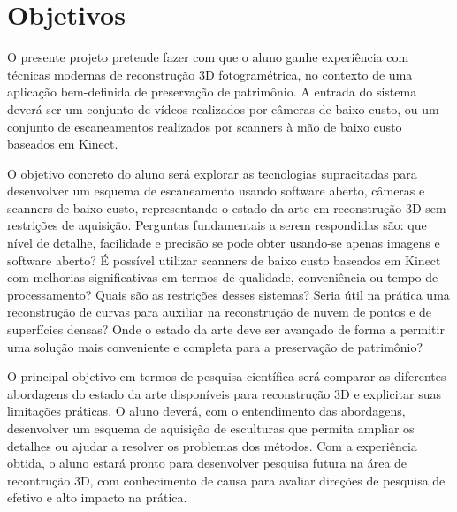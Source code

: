\section{Objetivos}

O presente projeto pretende fazer com que o aluno ganhe experiência com técnicas
modernas de reconstrução 3D fotogramétrica, no contexto de uma aplicação
bem-definida de preservação de patrimônio. A entrada do sistema deverá ser um
conjunto de vídeos realizados por câmeras de baixo custo, ou um conjunto de
escaneamentos realizados por scanners à mão de baixo custo baseados em Kinect.

O objetivo concreto do aluno será explorar as tecnologias supracitadas para
desenvolver um esquema de escaneamento usando software aberto, câmeras e
scanners de baixo custo, representando o estado da arte em reconstrução 3D sem
restrições de aquisição. Perguntas fundamentais a serem respondidas são: que
nível de detalhe, facilidade e precisão se pode obter usando-se apenas imagens e software
aberto? É possível utilizar scanners de baixo custo baseados em Kinect com
melhorias significativas em termos de qualidade, conveniência ou tempo de
processamento?  Quais são as restrições desses sistemas? Seria útil na prática
uma reconstrução de curvas para auxiliar na reconstrução de nuvem de pontos e de
superfícies densas? Onde o estado da arte deve ser avançado de forma a permitir
uma solução mais conveniente e completa para a preservação de patrimônio?

O principal objetivo em termos de pesquisa científica será comparar as
diferentes abordagens do estado da arte disponíveis para reconstrução 3D e
explicitar suas limitações práticas. O aluno deverá, com o entendimento das
abordagens, desenvolver um esquema de aquisição de esculturas que permita
ampliar os detalhes ou ajudar a resolver os problemas dos métodos. Com a
experiência obtida, o aluno estará pronto para desenvolver pesquisa futura na
área de recontrução 3D, com conhecimento de causa para avaliar direções de
pesquisa de efetivo e alto impacto na prática.




